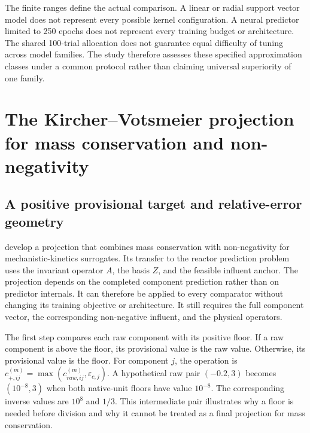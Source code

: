 The finite ranges define the actual comparison. A linear or radial support vector model does not represent every possible kernel configuration. A neural predictor limited to 250 epochs does not represent every training budget or architecture. The shared 100-trial allocation does not guarantee equal difficulty of tuning across model families. The study therefore assesses these specified approximation classes under a common protocol rather than claiming universal superiority of one family.

\section{The Kircher--Votsmeier projection for mass conservation and non-negativity}

\subsection{A positive provisional target and relative-error geometry}

\citet{KircherVotsmeier2025} develop a projection that combines mass conservation with non-negativity for mechanistic-kinetics surrogates. Its transfer to the reactor prediction problem uses the invariant operator $A$, the basis $Z$, and the feasible influent anchor. The projection depends on the completed component prediction rather than on predictor internals. It can therefore be applied to every comparator without changing its training objective or architecture. It still requires the full component vector, the corresponding non-negative influent, and the physical operators.

The first step compares each raw component with its positive floor. If a raw component is above the floor, its provisional value is the raw value. Otherwise, its provisional value is the floor. For component $j$, the operation is $c_{+,ij}^{(m)}=\max(c_{raw,ij}^{(m)},\varepsilon_{c,j})$. A hypothetical raw pair $(-0.2,3)$ becomes $(10^{-8},3)$ when both native-unit floors have value $10^{-8}$. The corresponding inverse values are $10^8$ and $1/3$. This intermediate pair illustrates why a floor is needed before division and why it cannot be treated as a final projection for mass conservation.


